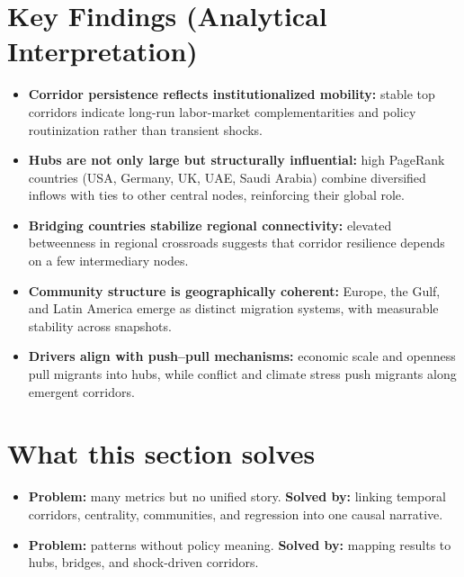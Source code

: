 \documentclass[12pt]{report}
\begin{document}
\section{Key Findings (Analytical Interpretation)}
\begin{itemize}
  \item \textbf{Corridor persistence reflects institutionalized mobility:} stable top corridors indicate long-run labor-market complementarities and policy routinization rather than transient shocks.
  \item \textbf{Hubs are not only large but structurally influential:} high PageRank countries (USA, Germany, UK, UAE, Saudi Arabia) combine diversified inflows with ties to other central nodes, reinforcing their global role.
  \item \textbf{Bridging countries stabilize regional connectivity:} elevated betweenness in regional crossroads suggests that corridor resilience depends on a few intermediary nodes.
  \item \textbf{Community structure is geographically coherent:} Europe, the Gulf, and Latin America emerge as distinct migration systems, with measurable stability across snapshots.
  \item \textbf{Drivers align with push--pull mechanisms:} economic scale and openness pull migrants into hubs, while conflict and climate stress push migrants along emergent corridors.
\end{itemize}

\section*{What this section solves}
\begin{itemize}
  \item \textbf{Problem:} many metrics but no unified story. \textbf{Solved by:} linking temporal corridors, centrality, communities, and regression into one causal narrative.
  \item \textbf{Problem:} patterns without policy meaning. \textbf{Solved by:} mapping results to hubs, bridges, and shock-driven corridors.
\end{itemize}
\end{document}
